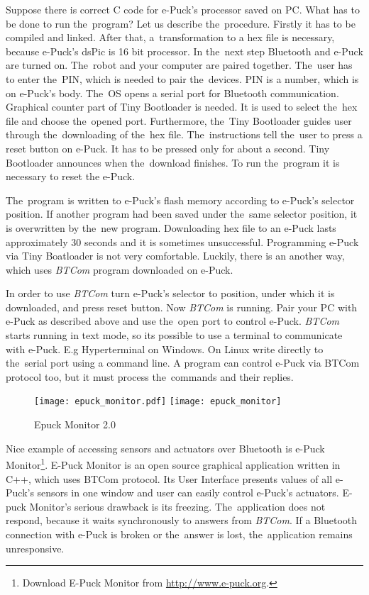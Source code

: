   Suppose there is correct C code for e-Puck's processor saved on PC. What has to be done to run the~program?
  Let us describe the~procedure.
  Firstly it has to be compiled and linked. After that, a~transformation to a hex file is necessary,
  because e-Puck's dsPic is 16 bit processor. In the~next step Bluetooth and e-Puck are turned on. 
  The~robot and your computer are paired together. The~user has to enter the~PIN, 
  which is needed to pair the~devices. 
  PIN is a number, which is on e-Puck's body.
  The~OS opens a serial port for Bluetooth communication.
  Graphical counter part of Tiny Bootloader is needed. It is used to select the~hex file and choose the~opened port. 
  Furthermore, the~Tiny Bootloader guides user through the~downloading of the~hex file.
  The~instructions tell the~user to press a reset button on e-Puck. It has to be pressed only for about a second.
  Tiny Bootloader announces when the~download finishes. To run the~program it is necessary to reset the e-Puck.
   
  The~program is written to e-Puck's flash memory according to e-Puck's selector position.
  If another program had been saved under the~same selector position, it is overwritten by the~new program.
  Downloading  hex file to an e-Puck lasts approximately 30 seconds and it is sometimes unsuccessful. 
  Programming e-Puck via Tiny Boatloader is not very comfortable. 
  Luckily, there is an another way, which uses {\it BTCom} program downloaded on e-Puck. 

  In order to use {\it BTCom} turn e-Puck's selector to position, under which it is downloaded, and press reset button.
  Now {\it BTCom} is running.  Pair your PC with e-Puck as described above and use the~open port
  to control e-Puck.
  {\it BTCom} starts running in text mode, so its possible to use a terminal to communicate with e-Puck.
  E.g Hyperterminal on Windows. On Linux write directly to the~serial port using a command line.
  A program can control e-Puck via BTCom protocol too, but it must process the~commands and their replies.
   

  \begin{figure}[hbp]
  \centering
  \ifpdf
    \texttt{[image: epuck\_monitor.pdf]}
  \else
    \texttt{[image: epuck\_monitor]}
  \fi
  \caption{\label{pic:monitor}%
   Epuck Monitor 2.0}
  \end{figure}

  Nice example of accessing sensors and actuators over Bluetooth is 
  e-Puck Monitor\footnote{\small{Download E-Puck Monitor from \url{http://www.e-puck.org}.}}.
  E-Puck Monitor is an open source graphical application written in C++, 
  which uses BTCom protocol. Its User Interface presents values of all e-Puck's 
  sensors in one window and user can easily control e-Puck's actuators.
  E-puck Monitor's serious drawback is its freezing. The~application does not respond, 
  because it waits synchronously to answers from {\it BTCom}.
  If a Bluetooth connection with e-Puck is broken or the~answer is lost, 
  the~application remains unresponsive.

